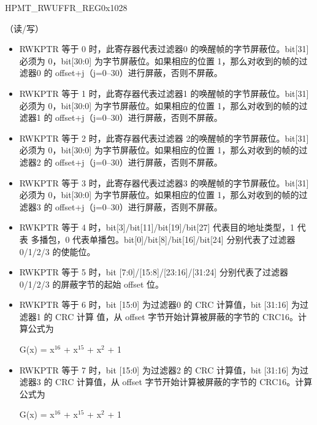 \begin{register}{H}{PMT\_RWUFFR\_REG}{0x1028}\label{regdesc:PMT_RWUFFRREG}
%
\regnewline%
\begin{regdesc}\begin{reglist}
\item [WKUPPKTFILTER]（读/写）

\begin{itemize}
\item RWKPTR 等于 0 时，此寄存器代表过滤器0 的唤醒帧的字节屏蔽位。bit[31] 必须为 0，bit[30:0] 为字节屏蔽位。如果相应的位置 1，那么对收到的帧的过滤器0 的 offset+j（j=0--30）进行屏蔽，否则不屏蔽。 \item RWKPTR 等于 1 时，此寄存器代表过滤器1 的唤醒帧的字节屏蔽位。bit[31] 必须为 0，bit[30:0] 为字节屏蔽位。如果相应的位置 1，那么对收到的帧的过滤器1 的 offset+j（j=0--30）进行屏蔽，否则不屏蔽。 \item RWKPTR 等于 2 时，此寄存器代表过滤器 2的唤醒帧的字节屏蔽位。bit[31] 必须为 0，bit[30:0] 为字节屏蔽位。如果相应的位置 1，那么对收到的帧的过滤器2 的 offset+j（j=0--30）进行屏蔽，否则不屏蔽。 \item RWKPTR 等于 3 时，此寄存器代表过滤器3 的唤醒帧的字节屏蔽位。bit[31] 必须为 0，bit[30:0] 为字节屏蔽位。如果相应的位置 1，那么对收到的帧的过滤器3 的 offset+j（j=0--30）进行屏蔽，否则不屏蔽。 \item RWKPTR 等于 4 时，bit[3]/bit[11]/bit[19]/bit[27] 代表目的地址类型，1 代表 多播包，0 代表单播包。bit[0]/bit[8]/bit[16]/bit[24] 分别代表了过滤器 0/1/2/3 的使能位。
\item RWKPTR 等于 5 时，bit [7:0]/[15:8]/[23:16]/[31:24] 分别代表了过滤器 0/1/2/3 的屏蔽字节的起始 offset 位。
\item RWKPTR 等于 6 时，bit [15:0] 为过滤器0 的 CRC 计算值，bit [31:16] 为过滤器1 的 CRC 计算 值，从 offset 字节开始计算被屏蔽的字节的 CRC16。计算公式为

G(x) = x$^\text{16}$ + x$^\text{15}$ + x$^\text{2}$ + 1

\item RWKPTR 等于 7 时，bit [15:0] 为过滤器2 的 CRC 计算值，bit [31:16] 为过滤器3 的 CRC 计算值，从 offset 字节开始计算被屏蔽的字节的 CRC16。计算公式为

G(x) = x$^\text{16}$ + x$^\text{15}$ + x$^\text{2}$ + 1

\end{itemize}
\end{reglist}\end{regdesc}
\end{register}


